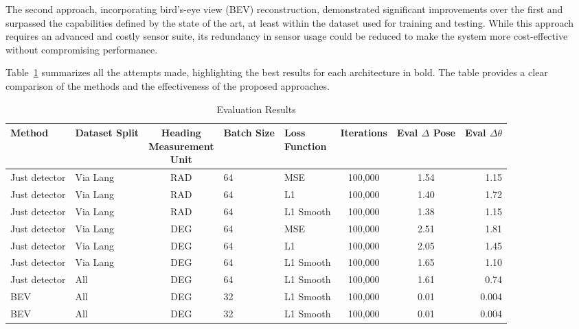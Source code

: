 The second approach, incorporating bird’s-eye view (BEV) reconstruction, demonstrated significant improvements over the first and surpassed the capabilities defined by the state of the art, at least within the dataset used for training and testing. While this approach requires an advanced and costly sensor suite, its redundancy in sensor usage could be reduced to make the system more cost-effective without compromising performance.

Table~\ref{tab:evaluation_results_2} summarizes all the attempts made, highlighting the best results for each architecture in bold. The table provides a clear comparison of the methods and the effectiveness of the proposed approaches.


\begin{table}[H]
\centering
\caption{Evaluation Results}
\label{tab:evaluation_results_2}
\scriptsize %
\renewcommand{\arraystretch}{1} %
\begin{tabular}{llcllccr}
\toprule
\textbf{Method} & \textbf{Dataset Split} & \makecell{\textbf{Heading}\\\textbf{Measurement}\\\textbf{Unit}} & \textbf{Batch Size} & \makecell{\textbf{Loss}\\\textbf{Function}} & \textbf{Iterations} & \makecell{\textbf{Eval}\\$\Delta$ \textbf{Pose}} & \makecell{\textbf{Eval}\\$\Delta \theta$} \\
\midrule
Just detector & Via Lang & RAD & 64 & MSE        & 100,000 & 1.54 & 1.15 \\
Just detector & Via Lang & RAD & 64 & L1         & 100,000 & 1.40 & 1.72 \\
Just detector & Via Lang & RAD & 64 & L1 Smooth  & 100,000 & 1.38 & 1.15 \\
Just detector & Via Lang & DEG & 64 & MSE        & 100,000 & 2.51 & 1.81 \\
Just detector & Via Lang & DEG & 64 & L1         & 100,000 & 2.05 & 1.45 \\
Just detector & Via Lang & DEG & 64 & L1 Smooth  & 100,000 & 1.65 & 1.10 \\
Just detector & All      & DEG & 64 & L1 Smooth  & 100,000 & 1.61 & 0.74 \\
BEV           & All      & DEG & 32 & L1 Smooth  & 100,000 & 0.01 & 0.004 \\
BEV           & All      & DEG & 32 & L1 Smooth  & 100,000 & 0.01 & 0.004 \\
\bottomrule
\end{tabular}
\end{table}



